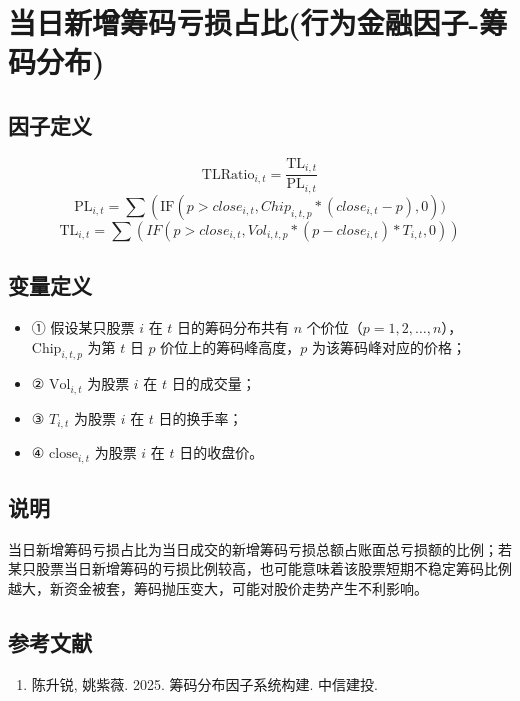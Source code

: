 \documentclass{article}
\begin{document}
\section{当日新增筹码亏损占比(行为金融因子-筹码分布)}

\subsection{因子定义}

\begin{equation}
    \mathrm{TLRatio}_{i,t} = \frac{\mathrm{TL}_{i,t}}{\mathrm{PL}_{i,t}}
\end{equation}
\begin{equation}
    \mathrm{PL}_{i,t} = \sum \left( \mathrm{IF}(p> close_{i,t},Chip_{i,t,p}* (close_{i,t}-p),0))
\end{equation}
\begin{equation}
    \mathrm{TL}_{i,t} = \sum (IF(p > close_{i,t},Vol_{i,t,p}*(p-close_{i,t})*T_{i,t},0))
\end{equation}

\subsection{变量定义}
\begin{itemize}
    \item ① 假设某只股票 \( i \) 在 \( t \) 日的筹码分布共有 \( n \) 个价位（\( p = 1, 2, \ldots, n \)），\( \mathrm{Chip}_{i,t,p} \) 为第 \( t \) 日 \( p \) 价位上的筹码峰高度，\( p \) 为该筹码峰对应的价格；
    \item ② \( \mathrm{Vol}_{i,t} \) 为股票 \( i \) 在 \( t \) 日的成交量；
    \item ③ \( T_{i,t} \) 为股票 \( i \) 在 \( t \) 日的换手率；
    \item ④ \( \mathrm{close}_{i,t} \) 为股票 \( i \) 在 \( t \) 日的收盘价。
\end{itemize}

\subsection{说明}
当日新增筹码亏损占比为当日成交的新增筹码亏损总额占账面总亏损额的比例；若某只股票当日新增筹码的亏损比例较高，也可能意味着该股票短期不稳定筹码比例越大，新资金被套，筹码抛压变大，可能对股价走势产生不利影响。

\subsection{参考文献}
\begin{enumerate}
    \item 陈升锐, 姚紫薇. 2025. 筹码分布因子系统构建. 中信建投.
\end{enumerate}
\end{document}
